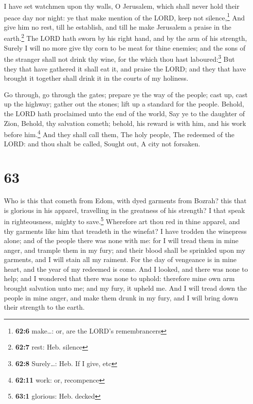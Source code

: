  I have set watchmen upon thy walls, O Jerusalem, which
shall never hold their peace day nor night: ye that make mention of the
LORD, keep not silence,\footnote{\textbf{62:6} make\ldots: or, are the
  LORD's remembrancers}  And give him no rest, till he
establish, and till he make Jerusalem a praise in the earth.\footnote{\textbf{62:7}
  rest: Heb. silence}  The LORD hath sworn by his right
hand, and by the arm of his strength, Surely I will no more give thy
corn to be meat for thine enemies; and the sons of the stranger shall
not drink thy wine, for the which thou hast laboured:\footnote{\textbf{62:8}
  Surely\ldots: Heb. If I give, etc}  But they that have
gathered it shall eat it, and praise the LORD; and they that have
brought it together shall drink it in the courts of my holiness.

 Go through, go through the gates; prepare ye the way of
the people; cast up, cast up the highway; gather out the stones; lift up
a standard for the people.  Behold, the LORD hath
proclaimed unto the end of the world, Say ye to the daughter of Zion,
Behold, thy salvation cometh; behold, his reward is with him, and his
work before him.\footnote{\textbf{62:11} work: or, recompence}
 And they shall call them, The holy people, The redeemed
of the LORD: and thou shalt be called, Sought out, A city not forsaken.

\hypertarget{section-62}{%
\section{63}\label{section-62}}

 Who is this that cometh from Edom, with dyed garments
from Bozrah? this that is glorious in his apparel, travelling in the
greatness of his strength? I that speak in righteousness, mighty to
save.\footnote{\textbf{63:1} glorious: Heb. decked} 
Wherefore art thou red in thine apparel, and thy garments like him that
treadeth in the winefat?  I have trodden the winepress
alone; and of the people there was none with me: for I will tread them
in mine anger, and trample them in my fury; and their blood shall be
sprinkled upon my garments, and I will stain all my raiment.
 For the day of vengeance is in mine heart, and the year
of my redeemed is come.  And I looked, and there was none
to help; and I wondered that there was none to uphold: therefore mine
own arm brought salvation unto me; and my fury, it upheld me.
 And I will tread down the people in mine anger, and make
them drunk in my fury, and I will bring down their strength to the
earth.

